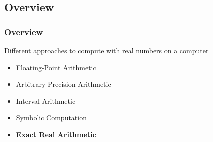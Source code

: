 \subsection{Overview}
\begin{frame}
  \frametitle{Overview}
  Different approaches to compute with real numbers on a computer
  \begin{itemize}[<+->]
      \item Floating-Point Arithmetic
      \item Arbitrary-Precision Arithmetic
      \item Interval Arithmetic
      \item Symbolic Computation
      \item \textbf{Exact Real Arithmetic}
  \end{itemize}
\end{frame}
